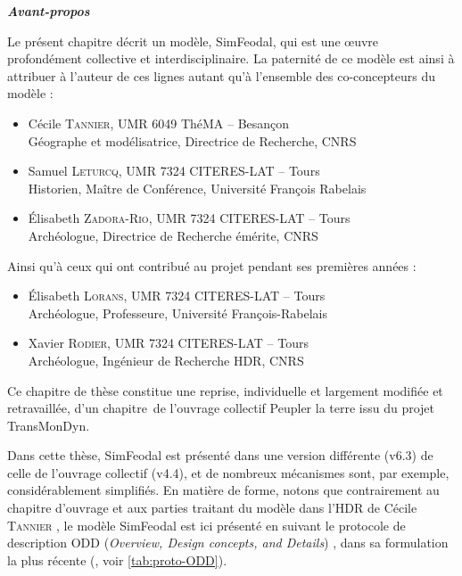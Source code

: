 \begin{mdframed}[backgroundcolor=black!5,footnoteinside=false]
\textbf{\hypertarget{avant-propos}{\textit{Avant-propos}}}

Le présent chapitre décrit un modèle, SimFeodal, qui est une œuvre profondément collective et interdisciplinaire.
La paternité de ce modèle est ainsi à attribuer à l'auteur de ces lignes autant qu'à l'ensemble des co-concepteurs du modèle :
\begin{itemize}
	\item Cécile \textsc{Tannier}, UMR 6049 ThéMA -- Besançon\\
	Géographe et modélisatrice, Directrice de Recherche, CNRS
	\item Samuel \textsc{Leturcq}, UMR 7324 CITERES-LAT -- Tours\\
	Historien, Maître de Conférence, Université François Rabelais
	\item Élisabeth \textsc{Zadora-Rio}, UMR 7324 CITERES-LAT -- Tours\\
	Archéologue, Directrice de Recherche émérite, CNRS
\end{itemize}
Ainsi qu'à ceux qui ont contribué au projet pendant ses premières années :
\begin{itemize}
	\item Élisabeth \textsc{Lorans}, UMR 7324 CITERES-LAT -- Tours\\
	Archéologue, Professeure, Université François-Rabelais
	\item Xavier \textsc{Rodier}, UMR 7324 CITERES-LAT -- Tours\\
	Archéologue, Ingénieur de Recherche HDR, CNRS
\end{itemize}
Ce chapitre de thèse constitue une reprise, individuelle et largement modifiée et retravaillée, d'un chapitre\footnotemark{}~de l'ouvrage collectif \og Peupler la terre\fg{} \autocite{sanders2018peupler} issu du projet TransMonDyn\footnotemark.

\noindent Dans cette thèse, SimFeodal est présenté dans une version différente (v6.3) de celle de l'ouvrage collectif (v4.4), et de nombreux mécanismes sont, par exemple, considérablement simplifiés.
En matière de forme, notons que contrairement au chapitre d'ouvrage et aux parties traitant du modèle dans l'HDR de Cécile \textsc{Tannier} \autocite{tannier_analyse_2017}, le modèle SimFeodal est ici présenté en suivant le protocole de description \og ODD\fg{} (\textit{Overview, Design concepts, and Details}) \autocite{grimm_odd_2010}, dans sa formulation la plus récente (\cite{grimm_documenting_2017}, voir \cref{tab:proto-ODD}).


\end{mdframed}
